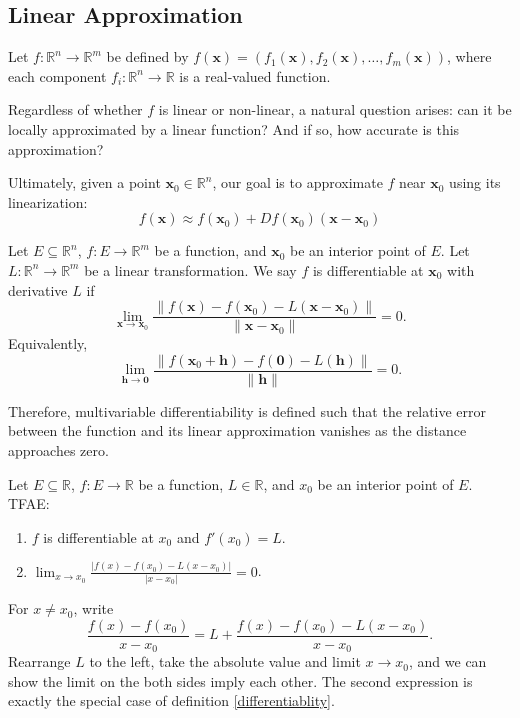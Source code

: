 \subsection{Linear Approximation}

Let $f: \mathbb{R}^n \to \mathbb{R}^m$ be defined by $f(\mathbf{x})=(f_1(\mathbf{x}), f_2(\mathbf{x}), \dots, f_m(\mathbf{x}))$, where each component $f_i: \mathbb{R}^n \to \mathbb{R}$ is a real-valued function. 

Regardless of whether $f$ is linear or non-linear, a natural question arises: can it be locally approximated by a linear function? And if so, how accurate is this approximation?

Ultimately, given a point $\mathbf{x}_0 \in \mathbb{R}^n$, our goal is to approximate $f$ near $\mathbf{x}_0$ using its linearization:
$$f(\mathbf{x}) \approx f(\mathbf{x}_0) + Df(\mathbf{x}_0) (\mathbf{x} - \mathbf{x}_0)$$


\begin{definition}[Differentiability]
Let $E \subseteq \mathbb{R}^n$, $f: E \to \mathbb{R}^m$ be a function, and $\mathbf{x}_0$ be an interior point of $E$. Let $L: \mathbb{R}^n \to \mathbb{R}^m$ be a linear transformation. We say $f$ is differentiable at $\mathbf{x}_0$ with derivative $L$ if 
$$\lim_{\mathbf{x} \to \mathbf{x}_0} \frac{\|f(\mathbf{x}) - f(\mathbf{x}_0) - L(\mathbf{x}-\mathbf{x}_0)\|}{\|\mathbf{x}-\mathbf{x}_0\|} = 0.$$
Equivalently,
$$\lim_{\mathbf{h}\to\mathbf{0}}\frac{\| f(\mathbf{x}_0+\mathbf{h})-f(\mathbf{0})-L(\mathbf{h}) \|}{\|\mathbf{h}\|}=0.$$
\label{differentiablity}
\end{definition}

Therefore, multivariable differentiability is defined such that the relative error between the function and its linear approximation vanishes as the distance approaches zero.

\begin{theorem}
Let $E \subseteq \mathbb{R}$, $f: E \to \mathbb{R}$ be a function, $L \in \mathbb{R}$, and $x_0$ be an interior point of $E$. TFAE:
\begin{enumerate}
    \item $f$ is differentiable at $x_0$ and $f'(x_0) = L$.
    \item $\lim_{x \to x_0} \frac{|f(x) - f(x_0) - L(x - x_0)|}{|x - x_0|} = 0$.
\end{enumerate}
\end{theorem}

\begin{pfbox}

For $x\neq x_0$, write
\[\frac{f(x) - f(x_0) }{x - x_0}= L + \frac{f(x) - f(x_0) - L(x - x_0)}{x - x_0}.\]
Rearrange $L$ to the left, take the absolute value and limit $x\to x_0$, and we can show the limit on the both sides imply each other.
The second expression is exactly the special case of definition \eqref{differentiablity}.

\end{pfbox}



